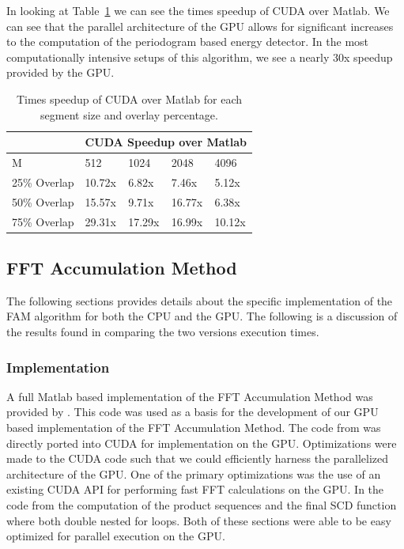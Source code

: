 In looking at Table~\ref{tbl:pwelch_cuda_speedup} we can see the times speedup of CUDA over Matlab.  We can see that the parallel architecture of the GPU allows for significant increases to the computation of the periodogram based energy detector.  In the most computationally intensive setups of this algorithm, we see a nearly 30x speedup provided by the GPU.

\begin{table}
\begin{center}
\begin{tabular}{|l|l|l|l|l|}
\hline
 & \multicolumn{4}{|c|}{CUDA Speedup over Matlab} \\
\hline
M & 512 & 1024 & 2048 & 4096 \\
\hline
25\% Overlap & 10.72x & 6.82x & 7.46x & 5.12x \\
50\% Overlap & 15.57x & 9.71x & 16.77x & 6.38x \\
75\% Overlap & 29.31x & 17.29x & 16.99x & 10.12x \\
\hline
\end{tabular}
\vspace{0.5cm}
\caption{Times speedup of CUDA over Matlab for each segment size and overlay percentage.}
\label{tbl:pwelch_cuda_speedup}
\end{center}
\end{table}


\subsection{FFT Accumulation Method}
\label{sect:FAM_result}
The following sections provides details about the specific implementation of the FAM algorithm for both the CPU and the GPU.  The following is a discussion of the results found in comparing the two versions execution times.

\subsubsection{Implementation}
A full Matlab based implementation of the FFT Accumulation Method was provided by \cite{Costa96}.  This code was used as a basis for the development of our GPU based implementation of the FFT Accumulation Method.  The code from \cite{Costa96} was directly ported into CUDA for implementation on the GPU.  Optimizations were made to the CUDA code such that we could efficiently harness the parallelized architecture of the GPU.  One of the primary optimizations was the use of an existing CUDA API for performing fast FFT calculations on the GPU.  In the code from \cite{Costa96} the computation of the product sequences and the final SCD function where both double nested for loops.  Both of these sections were able to be easy optimized for parallel execution on the GPU.

